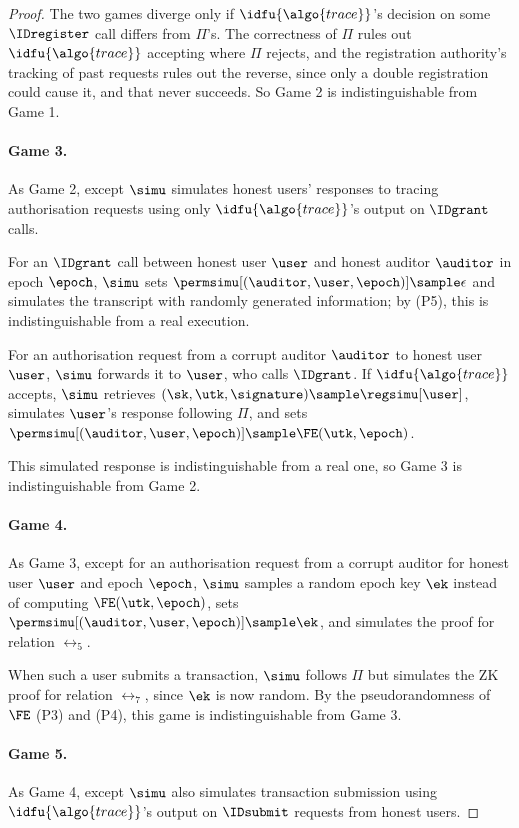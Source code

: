 \begin{proof}
  The two games diverge only if $\idfu{\algo{trace}}$'s decision on some
  $\IDregister$ call differs from $\Pi$'s. The correctness of $\Pi$ rules out
  $\idfu{\algo{trace}}$ accepting where $\Pi$ rejects, and the registration
  authority's tracking of past requests rules out the reverse, since only a
  double registration could cause it, and that never succeeds. So Game 2 is
  indistinguishable from Game 1.

  \paragraph{Game 3.} As Game 2, except $\simu$ simulates honest users'
  responses to tracing authorisation requests using only
  $\idfu{\algo{trace}}$'s output on $\IDgrant$ calls.

  For an $\IDgrant$ call between honest user $\user$ and honest auditor
  $\auditor$ in epoch $\epoch$, $\simu$ sets
  $\permsimu[(\auditor,\user,\epoch)] \sample \epsilon$ and simulates the
  transcript with randomly generated information; by (P5), this is
  indistinguishable from a real execution.

  For an authorisation request from a corrupt auditor $\auditor$ to honest user
  $\user$, $\simu$ forwards it to $\user$, who calls $\IDgrant$. If
  $\idfu{\algo{trace}}$ accepts, $\simu$ retrieves $(\sk, \utk, \signature)
  \sample \regsimu[\user]$, simulates $\user$'s response following $\Pi$, and
  sets $\permsimu[(\auditor,\user,\epoch)] \sample \FE(\utk, \epoch)$.

  This simulated response is indistinguishable from a real one, so Game 3 is
  indistinguishable from Game 2.

  \paragraph{Game 4.} As Game 3, except for an authorisation request from a
  corrupt auditor for honest user $\user$ and epoch $\epoch$, $\simu$ samples a
  random epoch key $\ek$ instead of computing $\FE(\utk, \epoch)$, sets
  $\permsimu[(\auditor,\user,\epoch)] \sample \ek$, and simulates the proof for
  relation $\rel_5$.

  When such a user submits a transaction, $\simu$ follows $\Pi$ but simulates
  the ZK proof for relation $\rel_7$, since $\ek$ is now random. By the
  pseudorandomness of $\FE$ (P3) and (P4), this game is indistinguishable
  from Game 3.

  \paragraph{Game 5.} As Game 4, except $\simu$ also simulates transaction
  submission using $\idfu{\algo{trace}}$'s output on $\IDsubmit$ requests from
  honest users.


\end{proof}
